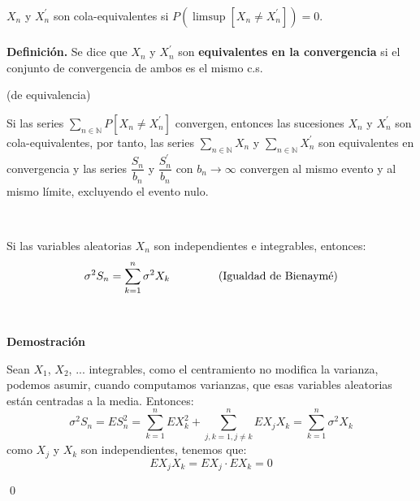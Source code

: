\

$X_n$ y $X_n^{'}$ son cola-equivalentes si 
$P \left( \limsup [X_n \not = X_n^{'}] \right) = 0$.
\\\\
\textbf{Definición. } %
Se dice que $X_n$ y $X_n^{\prime}$ son  \textbf{equivalentes en la convergencia} si el conjunto de convergencia de ambos es el mismo c.s.



\begin{lemma} (de equivalencia)
  
Si las series $\sum_{n\in\mathbb{N}} P[X_n\neq X_n^{\prime}]$ convergen, entonces las sucesiones $X_n$ y $X_n^{\prime}$ son cola-equivalentes, por tanto, las series $\sum_{n\in\mathbb{N}} X_n$ y $\sum_{n\in\mathbb{N}} X_n^{\prime}$ son equivalentes en  convergencia y las series $\dfrac{S_n}{b_n}$ y $\dfrac{S_n^{\prime}}{b_n}$ con $b_n \rightarrow\infty$ convergen al mismo evento y al mismo límite, excluyendo el evento nulo.
\end{lemma}



\

Si las variables aleatorias $X_n$ son independientes e integrables, entonces:
$$ \sigma^2 S_n=\sum_{k=1}^n \sigma^2 X_k \hspace{1.5cm} \text{(Igualdad de Bienaymé)}$$

\

\textbf{Demostración}

Sean $X_1$, $X_2$, ... integrables, como el centramiento no modifica la varianza, podemos asumir, cuando computamos varianzas, que esas variables aleatorias están centradas a la media. Entonces:
$$\sigma^2 S_n=ES_n^2=\sum_{k=1}^n EX_k^2+\sum_{j,k=1, j\not = k}^n EX_jX_k=\sum_{k=1}^n\sigma^2 X_k$$
como $X_j$ y $X_k$ son independientes, tenemos que:
$$EX_jX_k=EX_j\cdot EX_k=0$$

\qed


\

